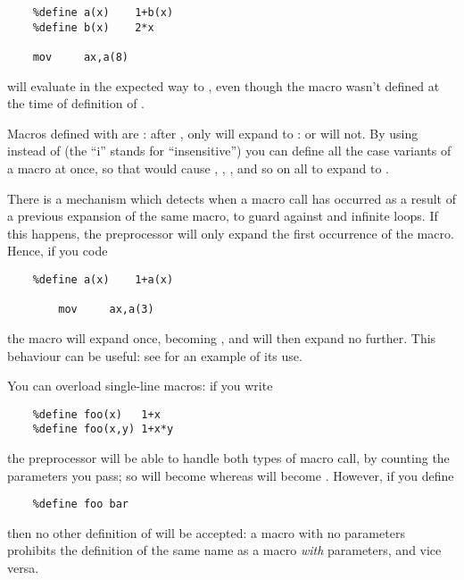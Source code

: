 \begin{lstlisting}
	%define a(x)    1+b(x)
	%define b(x)    2*x

	mov     ax,a(8)
\end{lstlisting}

will evaluate in the expected way to , even though
the macro  wasn't defined at the time of definition of .

Macros defined with  are : after
, only  will expand to :
 or  will not. By using  instead of
 (the ``i'' stands for ``insensitive'') you can define
all the case variants of a macro at once, so that 
would cause , , ,  and so on
all to expand to .

There is a mechanism which detects when a macro call has occurred as
a result of a previous expansion of the same macro, to guard against
 and infinite loops. If this happens,
the preprocessor will only expand the first occurrence of the macro.
Hence, if you code

\begin{lstlisting}
	%define a(x)    1+a(x)

		mov     ax,a(3)
\end{lstlisting}

the macro  will expand once, becoming , and will
then expand no further. This behaviour can be useful: see 
for an example of its use.

You can overload single-line
macros: if you write

\begin{lstlisting}
	%define foo(x)   1+x
	%define foo(x,y) 1+x*y
\end{lstlisting}

the preprocessor will be able to handle both types of macro call,
by counting the parameters you pass; so  will become
 whereas  will become .
However, if you define

\begin{lstlisting}
	%define foo bar
\end{lstlisting}

then no other definition of  will be accepted: a macro with
no parameters prohibits the definition of the same name as a macro
\emph{with} parameters, and vice versa.

